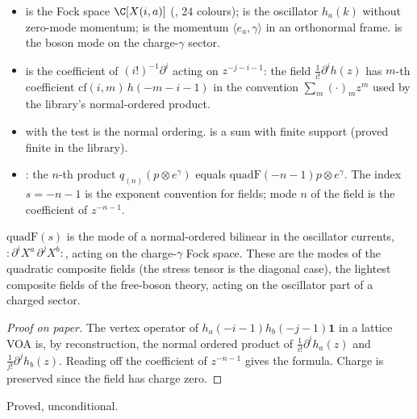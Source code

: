 \begin{dictionary}
\begin{itemize}
\item {} is the Fock space $\C[X(i,a)]$ (, $24$ colours);
   is the oscillator $h_a(k)$ without zero-mode momentum;  is the
  momentum $\langle e_a,\gamma\rangle$ in an orthonormal frame.   is the boson mode on the
  charge-$\gamma$ sector.
\item {} is the coefficient of $(i!)^{-1}\partial^i$ acting on $z^{-j-i-1}$: the field
  $\frac1{i!}\partial^ih(z)$ has $m$-th coefficient $\mathrm{cf}(i,m)\,h(-m-i-1)$ in the convention
  $\sum_m(\cdot)_m z^m$ used by the library's normal-ordered product.
\item {} with the test  is the normal ordering.   is a sum with finite
  support (proved finite in the library).
\item {}: the $n$-th product $q_{(n)}(p\otimes e^\gamma)$ equals $\mathrm{quadF}(-n-1)p\otimes e^\gamma$.
  The index $s=-n-1$ is the exponent convention for fields; mode $n$ of the field is the
  coefficient of $z^{-n-1}$.
\end{itemize}
\end{dictionary}

\begin{physics}
$\mathrm{quadF}(s)$ is the mode of a normal-ordered bilinear in the oscillator currents, $:\!\partial^iX^a\,\partial^jX^b\!:$, acting on the charge-$\gamma$ Fock space. These are the modes of the quadratic composite fields (the stress tensor is the diagonal case), the lightest composite fields of the free-boson theory, acting on the oscillator part of a charged sector.
\end{physics}
\begin{proof}[Proof on paper]
The vertex operator of $h_a(-i-1)h_b(-j-1)\mathbf 1$ in a lattice VOA is, by reconstruction, the normal
ordered product of $\frac1{i!}\partial^ih_a(z)$ and $\frac1{j!}\partial^jh_b(z)$.  Reading off the
coefficient of $z^{-n-1}$ gives the formula.  Charge is preserved since the field has charge zero.
\end{proof}
\begin{status}Proved, unconditional.\end{status}

